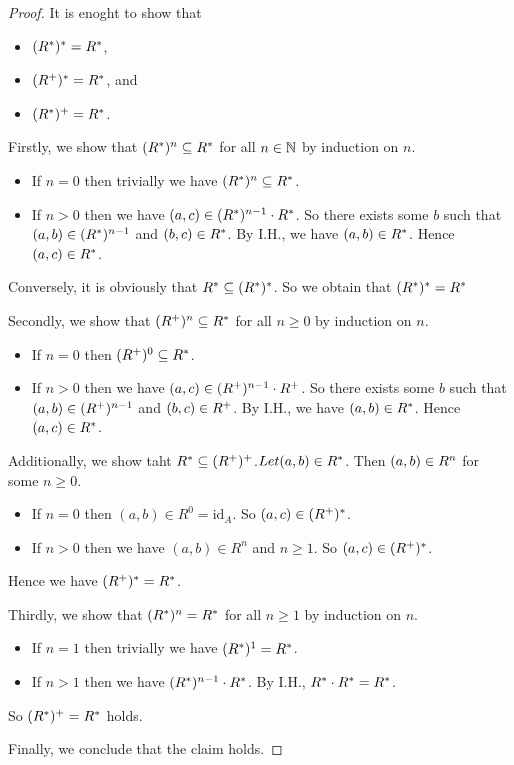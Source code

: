 \documentclass[autodetect-enginem]{article}
\theoremstyle{plain}
\theoremstyle{definition}
\theoremstyle{definition}
\begin{document}
\begin{proof}
    It is enoght to show that
    \begin{itemize}
        \item $(R^{*})^{*} = R^{*}$,
        \item $(R^{+})^{*} = R^{*}$, and
        \item $(R^{*})^+ = R^{*}$.
    \end{itemize}

    Firstly, we show that $(R^{*})^{n} \subseteq R^{*}$ for all $n \in \mathbb{N}$ by induction on $n$.
        \begin{itemize}
            \item If $n = 0$ then trivially we have $(R^{*})^n \subseteq R^{*}$.
            \item If $n > 0$ then we have $(a,c) \in (R^{*})^{n-1} \cdot R^{*}$.
                    So there exists some $b$ such that $(a,b) \in (R^{*})^{n-1}$
                    and $(b,c) \in R^{*}$. By I.H., we have $(a,b) \in R^{*}$.
                    Hence $(a,c) \in R^{*}$.
        \end{itemize}
        Conversely, it is obviously that $R^{*} \subseteq (R^{*})^*$.
        So we obtain that $(R^{*})^{*} = R^{*}$

    Secondly, we show that $(R^{+})^n \subseteq R^{*}$ for all $n \geq 0$ by induction on $n$.
        \begin{itemize}
            \item If $n = 0$ then $(R^{+})^0 \subseteq R^{*}$.
            \item If $n > 0$ then we have $(a,c) \in (R^{+})^{n-1} \cdot R^{+}$.
                  So there exists some $b$ such that $(a,b) \in (R^{+})^{n-1}$ and $(b,c) \in R^{+}$.
                  By I.H., we have $(a,b) \in R^{*}$. Hence $(a,c) \in R^{*}$.
        \end{itemize}
                  Additionally, we show taht $R^{*} \subseteq (R^{+})^+$.$Let (a,b) \in R^{*}$.
                  Then $(a,b) \in R^{n}$ for some $n \geq 0$.
                  \begin{itemize}
                      \item If $n = 0$ then $(a,b) \in R^0 = \mathrm{id}_A$. So $(a,c) \in (R^{+})^{*}$.
                      \item If $n > 0$ then we have $(a,b) \in R^n$ and $n \geq 1$. So $(a,c) \in (R^{+})^{*}$.
                  \end{itemize} 
                 Hence we have $(R^{+})^* = R^{*}$.

    Thirdly, we show that $(R^{*})^n = R^{*}$ for all $n \geq 1$ by induction on $n$.
        \begin{itemize}
            \item If $n = 1$ then trivially we have $(R^{*})^1 = R^{*}$.
            \item If $n > 1$ then we have $(R^{*})^{n-1} \cdot R^{*}$. By I.H., $R^{*} \cdot R^{*} = R^{*}$.
        \end{itemize}
        So $(R^{*})^+ = R^{*}$ holds.

    Finally, we conclude that the claim holds.
\end{proof}
\end{document}
